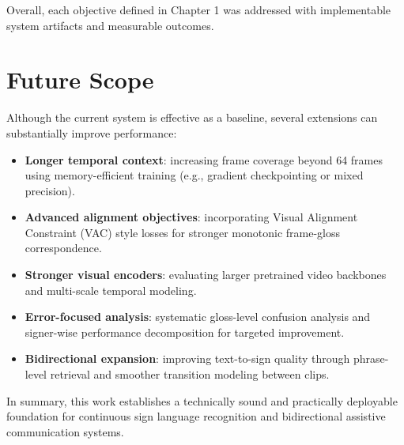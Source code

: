 Overall, each objective defined in Chapter 1 was addressed with implementable system artifacts and measurable outcomes.

\section{Future Scope}

Although the current system is effective as a baseline, several extensions can substantially improve performance:
\begin{itemize}
    \item \textbf{Longer temporal context}: increasing frame coverage beyond 64 frames using memory-efficient training (e.g., gradient checkpointing or mixed precision).
    \item \textbf{Advanced alignment objectives}: incorporating Visual Alignment Constraint (VAC) style losses for stronger monotonic frame-gloss correspondence.
    \item \textbf{Stronger visual encoders}: evaluating larger pretrained video backbones and multi-scale temporal modeling.
    \item \textbf{Error-focused analysis}: systematic gloss-level confusion analysis and signer-wise performance decomposition for targeted improvement.
    \item \textbf{Bidirectional expansion}: improving text-to-sign quality through phrase-level retrieval and smoother transition modeling between clips.
\end{itemize}

In summary, this work establishes a technically sound and practically deployable foundation for continuous sign language recognition and bidirectional assistive communication systems.

